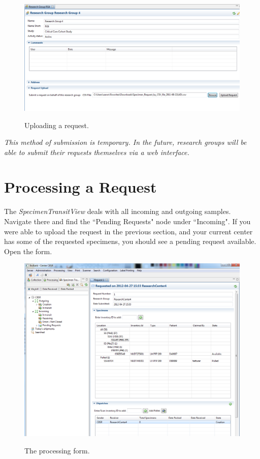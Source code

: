\begin{figure}[H]
      \centering
      \scalebox{0.5}
      { \includegraphics*{screenshots/specimen_request/submit_request.png} }
      \caption{Uploading a request.}
      \label{Uploading}
\end{figure}

 \emph{This method of submission is temporary.  In the future, research groups will be able to submit their requests themselves via a web interface.}
 
 \section{Processing a Request}
 
 The \emph{SpecimenTransitView} deals with all incoming and outgoing samples.  Navigate there and find the ``Pending Requests" node under ``Incoming".  If you were able to upload the request in the previous section, and your current center has some of the requested specimens, you should see a pending request available.  Open the form.

\begin{figure}[H]
      \centering
      \scalebox{0.5}
      { \includegraphics*{screenshots/specimen_request/request_form.png} }
      \caption{The processing form.}
      \label{Request Form}
\end{figure}
      
